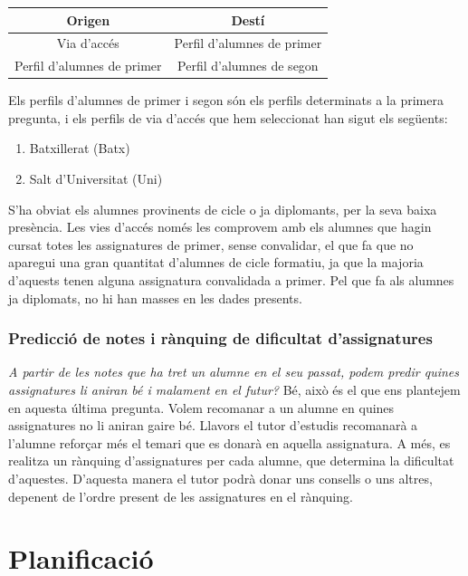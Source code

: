 \documentclass[12pt,a4paper,catalan]{article}
\begin{document}
\begin{table}[h]
\centering
\begin{tabular}{@{}cc@{}}
\toprule
{\bf Origen}               & {\bf Destí}                \\ \midrule
Via d'accés                & Perfil d'alumnes de primer \\
Perfil d'alumnes de primer & Perfil d'alumnes de segon  \\ \bottomrule
\end{tabular}
\end{table}

Els perfils d'alumnes de primer i segon són els perfils determinats a la primera pregunta, i els perfils de via d'accés que hem seleccionat han sigut els següents:
\begin{enumerate}
	\item Batxillerat (Batx)
	\item Salt d'Universitat (Uni)
\end{enumerate}

S'ha obviat els alumnes provinents de cicle o ja diplomants, per la seva baixa presència. Les vies d'accés només les comprovem amb els alumnes que hagin cursat totes les assignatures de primer, sense convalidar, el que fa que no aparegui una gran quantitat d'alumnes de cicle formatiu, ja que la majoria d'aquests tenen alguna assignatura convalidada a primer. Pel que fa als alumnes ja diplomats, no hi han masses en les dades presents.

\subsubsection{Predicció de notes i rànquing de dificultat d'assignatures}
\textit{A partir de les notes que ha tret un alumne en el seu passat, podem predir quines assignatures li aniran bé i malament en el futur?} Bé, això és el que ens plantejem en aquesta última pregunta. Volem recomanar a un alumne en quines assignatures no li aniran gaire bé. Llavors el tutor d'estudis recomanarà a l'alumne reforçar més el temari que es donarà en aquella assignatura. A més, es realitza un rànquing d'assignatures per cada alumne, que determina la dificultat d'aquestes. D'aquesta manera el tutor podrà donar uns consells o uns altres, depenent de l'ordre present de les assignatures en el rànquing.
\newpage

\section{Planificació}
\end{document}
